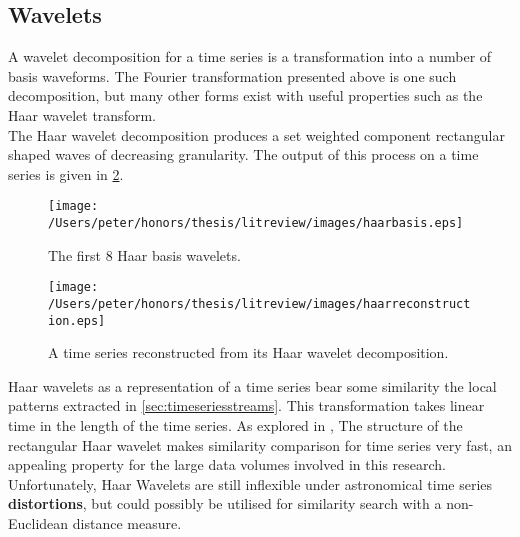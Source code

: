 	\subsection{Wavelets}
	A wavelet decomposition for a time series is a transformation into a number of basis waveforms. The Fourier transformation presented above is one such decomposition, but many other forms exist with useful properties such as the Haar wavelet transform. 
	\\
	The Haar wavelet decomposition produces a set weighted component rectangular shaped waves of decreasing granularity. The output of this process on a time series is given in \ref{fig:haarreconstruction}.

	\begin{figure}[ht!]
	\centering
	\texttt{[image: /Users/peter/honors/thesis/litreview/images/haarbasis.eps]}
	\caption{The first 8 Haar basis wavelets.}
	\label{fig:haarwavelets}
	\end{figure}
	
	\begin{figure}[ht!]
	\centering
	\texttt{[image: /Users/peter/honors/thesis/litreview/images/haarreconstruction.eps]}
	\caption{A time series reconstructed from its Haar wavelet decomposition.}
	\label{fig:haarreconstruction}
	\end{figure}


	Haar wavelets as a representation of a time series bear some similarity the local patterns extracted in \ref{sec:timeseriesstreams}. This transformation takes linear time in the length of the time series. As explored in \citep{popivanov2002similarity}, The structure of the rectangular Haar wavelet makes similarity comparison for time series very fast, an appealing property for the large data volumes involved in this research. Unfortunately, Haar Wavelets are still inflexible under astronomical time series \textbf{distortions}, but could possibly be utilised for similarity search with a non-Euclidean distance measure.
	
	
